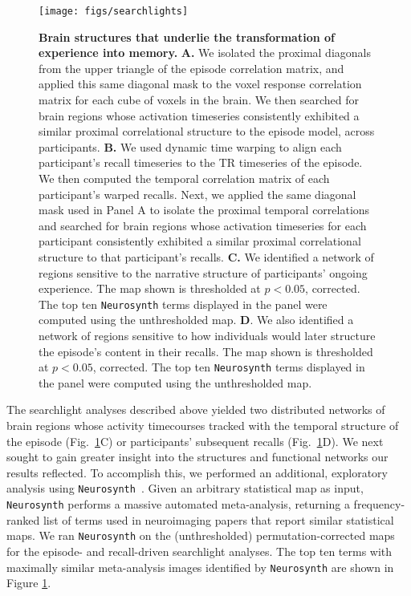 \documentclass[10pt]{article}
\begin{document}
\begin{figure}[tp]
\centering
\texttt{[image: figs/searchlights]}
\caption{\small \textbf{Brain structures that underlie the transformation of experience into memory.} \textbf{A.} We isolated the proximal diagonals from the upper triangle of the episode correlation matrix, and applied this same diagonal mask to the voxel response correlation matrix for each cube of voxels in the brain. We then searched for brain regions whose activation timeseries consistently exhibited a similar proximal correlational structure to the episode model, across participants.  \textbf{B.} We used dynamic time warping \citep{BernClif94} to align each participant's recall timeseries to the TR timeseries of the episode.  We then computed the temporal correlation matrix of each participant's warped recalls.  Next, we applied the same diagonal mask used in Panel A to isolate the proximal temporal correlations and searched for brain regions whose activation timeseries for each participant consistently exhibited a similar proximal correlational structure to that participant's recalls.  \textbf{C.} We identified a network of regions sensitive to the narrative structure of participants' ongoing experience.  The map shown is thresholded at $p < 0.05$, corrected.  The top ten \texttt{Neurosynth} terms displayed in the panel were computed using the unthresholded map.  \textbf{D}. We also identified a network of regions sensitive to how individuals would later structure the episode's content in their recalls.  The map shown is thresholded at $p < 0.05$, corrected.  The top ten \texttt{Neurosynth} terms displayed in the panel were computed using the unthresholded map.}
\label{fig:brainz}
\end{figure}

The searchlight analyses described above yielded two distributed networks of brain regions whose activity timecourses tracked with the temporal structure of the episode (Fig.~\ref{fig:brainz}C) or participants' subsequent recalls (Fig.~\ref{fig:brainz}D).  We next sought to gain greater insight into the structures and functional networks our results reflected.  To accomplish this, we performed an additional, exploratory analysis using \texttt{Neurosynth}~\citep{YarkEtal11}.  Given an arbitrary statistical map as input, \texttt{Neurosynth} performs a massive automated meta-analysis, returning a frequency-ranked list of terms used in neuroimaging papers that report similar statistical maps. We ran \texttt{Neurosynth} on the (unthresholded) permutation-corrected maps for the episode- and recall-driven searchlight analyses. The top ten terms with maximally similar meta-analysis images identified by \texttt{Neurosynth} are shown in Figure \ref{fig:brainz}.
\end{document}
